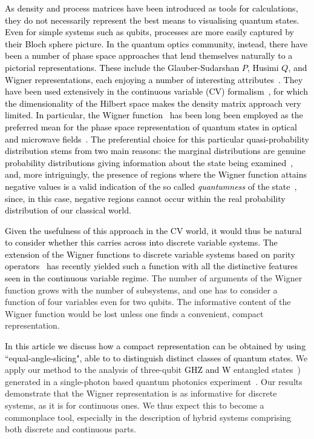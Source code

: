 \documentclass[pra,reprint,showkeys,showpacs,times,superscriptaddress]{revtex4-1}
\newcommand{\red}{\textcolor{black}}
\begin{document}
\red{As density and process matrices have been introduced as tools for calculations, they do not necessarily represent the best means to visualising quantum states. Even for simple systems such as qubits, processes are more easily captured by their Bloch sphere picture. In the quantum optics community, instead, there have been a number of phase space approaches that lend themselves naturally to a pictorial representations. These include the Glauber-Sudarshan $P$, Husimi $Q$, and Wigner representations, each enjoying a number of interesting attributes~\cite{PerelomovB}. They have been used extensively in the continuous variable (CV) formalism~\cite{Braunstein05,Weedbrook12}, for which the dimensionality of the Hilbert space makes the density matrix approach very limited. In particular, the Wigner function~\cite{Wigner1932} has been long been employed as the preferred mean for the phase space representation of quantum states in optical and microwave fields~\cite{Lvovsky09,Wallraff,Clealand}. The preferential choice for this particular quasi-probability distribution stems from two main reasons: the marginal distributions are genuine probability distributions giving information about the state being examined~\cite{Wigner1932}, and, more intriguingly, the presence of regions where the Wigner function attains negative values is a valid indication of the so called  {\it quantumness} of the state~\cite{Ourjoumtsev06}, since, in this case, negative regions cannot occur within the real probability distribution of our classical world.}

\red{Given the usefulness of this approach in the CV world, it would thus be natural to consider whether this carries across into discrete variable systems. The extension of the Wigner functions  to discrete variable systems based on parity operators~\cite{1601.07772,1605.08922} has recently yielded such a function with all the distinctive features seen in the continuous variable regime. } The number of arguments of the Wigner function grows with the number of subsystems, and one has to consider a function of four variables even for two qubits. The informative content of the Wigner function would be lost unless one finds a convenient, compact representation.

\red{In this article we discuss how a compact representation can be obtained by using ``equal-angle-slicing", able to to distinguish distinct classes of quantum states.}  We apply our method to the analysis of three-qubit \red{GHZ and W} entangled states~\cite{PhysRevA.62.062314}) generated in a single-photon based quantum photonics experiment~\cite{Ciampini17}. Our results demonstrate that the Wigner representation is as informative for discrete systems, as it is for continuous ones. We thus expect this to become a commonplace tool, especially in the description of hybrid systems \cite{Bimbard10,Wallraff12,Jeong14,Morin14} comprising both discrete and continuous parts.
\end{document}
